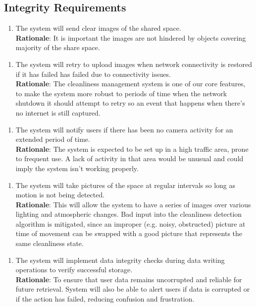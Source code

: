 \documentclass{article}
\begin{document}
\subsection{Integrity Requirements}
\begin{enumerate}[{IR}1. ]
    \item The system will send clear images of the shared space.\\
    \textbf{Rationale}: It is important the images are not hindered by objects covering majority of the share space. 
\end{enumerate} 
\begin{enumerate}[{IR}Mag2. ]
    \item The system will retry to upload images when network connectivity is restored if it has failed has failed due to connectivity issues.\\
    \textbf{Rationale}: The cleanliness management system is one of our core features, to make the system more robust to periods of time when the network shutdown it should attempt to retry so an event that happens when there's no internet is still captured. 
\end{enumerate} 
\begin{enumerate}[{IR}Mag3. ]
    \item The system will notify users if there has been no camera activity for an extended period of time.\\
    \textbf{Rationale}: The system is expected to be set up in a high traffic area, prone to frequent use. A lack of activity in that area would be unusual and could imply the system isn't working properly.
\end{enumerate}
\begin{enumerate}[{IR}Jan1. ]
    \item The system will take pictures of the space at regular intervals so long as motion is not being detected.\\
    \textbf{Rationale}: This will allow the system to have a series of images over various lighting and atmospheric changes. Bad input into the cleanliness detection algorithm is mitigated, since an improper (e.g. noisy, obstructed) picture at time of movement can be swapped with a good picture that represents the same cleanliness state.
\end{enumerate} 
\begin{enumerate}[{IR}Zay1. ]
    \item The system will implement data integrity checks during data writing operations to verify successful storage.\\
    \textbf{Rationale}:  To ensure that user data remains uncorrupted and reliable for future retrieval. System will also be able to alert users if data is corrupted or if the action has failed, reducing confusion and frustration.
\end{enumerate} 
\end{document}
